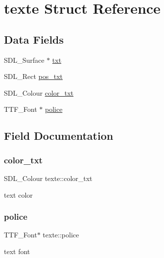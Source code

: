 \hypertarget{structtexte}{}\section{texte Struct Reference}
\label{structtexte}
\subsection*{Data Fields}
\begin{DoxyCompactItemize}
\item 
S\+D\+L\+\_\+\+Surface $\ast$ \hyperlink{structtexte_a461d9c1438bee1b2f61bfb485c28e717}{txt}
\item 
S\+D\+L\+\_\+\+Rect \hyperlink{structtexte_af288dd2b4a7ef446ae7e1f4764c8f11a}{pos\+\_\+txt}
\item 
S\+D\+L\+\_\+\+Colour \hyperlink{structtexte_a967b7cfef0259cf7cb23418fdb3b005c}{color\+\_\+txt}
\item 
T\+T\+F\+\_\+\+Font $\ast$ \hyperlink{structtexte_a3f720fd90cc3477f852034aded4ffbb9}{police}
\end{DoxyCompactItemize}


\subsection{Field Documentation}
\mbox{\label{structtexte_a967b7cfef0259cf7cb23418fdb3b005c}} 
\subsubsection{\texorpdfstring{color\+\_\+txt}{color\_txt}}
{\footnotesize\ttfamily S\+D\+L\+\_\+\+Colour texte\+::color\+\_\+txt}

text color \mbox{\label{structtexte_a3f720fd90cc3477f852034aded4ffbb9}} 
\subsubsection{\texorpdfstring{police}{police}}
{\footnotesize\ttfamily T\+T\+F\+\_\+\+Font$\ast$ texte\+::police}

text font \mbox{\label{structtexte_af288dd2b4a7ef446ae7e1f4764c8f11a}} 
